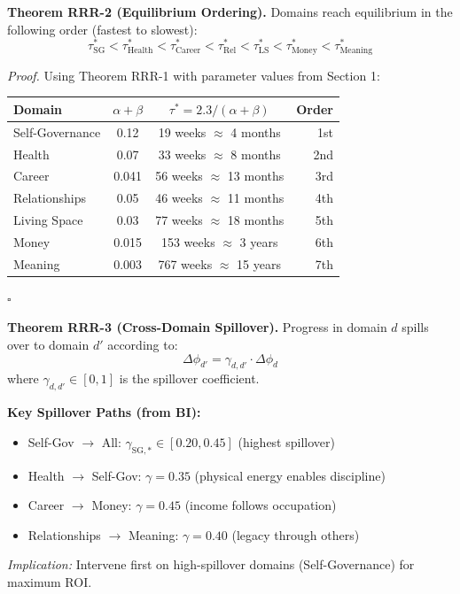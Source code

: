 \begin{tcolorbox}[colback=green!5!white, colframe=green!75!black, title=Theorem RRR-2: Domain Equilibrium Ordering]
\textbf{Theorem RRR-2 (Equilibrium Ordering).}
Domains reach equilibrium in the following order (fastest to slowest):
\begin{equation}
\tau^*_{\text{SG}} < \tau^*_{\text{Health}} < \tau^*_{\text{Career}} < \tau^*_{\text{Rel}} < \tau^*_{\text{LS}} < \tau^*_{\text{Money}} < \tau^*_{\text{Meaning}}
\end{equation}

\textit{Proof.}
Using Theorem RRR-1 with parameter values from Section 1:
\begin{center}
\small
\begin{tabular}{@{}lccr@{}}
\toprule
\textbf{Domain} & $\alpha + \beta$ & $\tau^* = 2.3/(\alpha+\beta)$ & \textbf{Order} \\
\midrule
Self-Governance & 0.12 & 19 weeks $\approx$ 4 months & 1st \\
Health & 0.07 & 33 weeks $\approx$ 8 months & 2nd \\
Career & 0.041 & 56 weeks $\approx$ 13 months & 3rd \\
Relationships & 0.05 & 46 weeks $\approx$ 11 months & 4th \\
Living Space & 0.03 & 77 weeks $\approx$ 18 months & 5th \\
Money & 0.015 & 153 weeks $\approx$ 3 years & 6th \\
Meaning & 0.003 & 767 weeks $\approx$ 15 years & 7th \\
\bottomrule
\end{tabular}
\end{center}
\hfill $\square$
\end{tcolorbox}

\begin{tcolorbox}[colback=green!5!white, colframe=green!75!black, title=Theorem RRR-3: Cross-Domain Spillover]
\textbf{Theorem RRR-3 (Cross-Domain Spillover).}
Progress in domain $d$ spills over to domain $d'$ according to:
\begin{equation}
\Delta \phi_{d'} = \gamma_{d,d'} \cdot \Delta \phi_d
\end{equation}
where $\gamma_{d,d'} \in [0,1]$ is the spillover coefficient.

\textbf{Key Spillover Paths (from BI):}
\begin{itemize}[nosep]
\item Self-Gov $\rightarrow$ All: $\gamma_{\text{SG},*} \in [0.20, 0.45]$ (highest spillover)
\item Health $\rightarrow$ Self-Gov: $\gamma = 0.35$ (physical energy enables discipline)
\item Career $\rightarrow$ Money: $\gamma = 0.45$ (income follows occupation)
\item Relationships $\rightarrow$ Meaning: $\gamma = 0.40$ (legacy through others)
\end{itemize}

\textit{Implication:} Intervene first on high-spillover domains (Self-Governance) for maximum ROI.
\end{tcolorbox}

